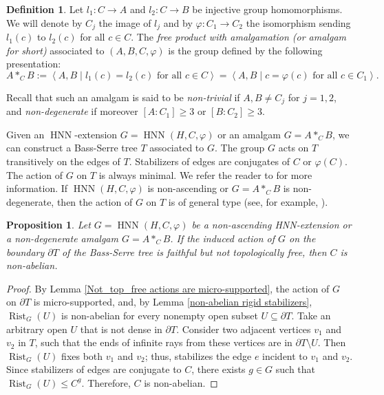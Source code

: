 \documentclass[11pt,letterpaper]{article}
\renewcommand{\phi}{\varphi}
\DeclareMathOperator{\rist}{Rist}
\DeclareMathOperator{\HNN}{HNN}
\newtheorem{prop}[thm]{Proposition}
\theoremstyle{definition}
\newtheorem{defn}[thm]{Definition}
\theoremstyle{remark}
\begin{document}
\begin{defn}
Let $l_1: C \rightarrow A$ and $l_2: C \rightarrow B$ be injective group homomorphisms. We will denote by $C_j$ the image of $l_j$ and by $\phi: C_1 \rightarrow C_2$ the isomorphism sending $l_1(c)$ to $l_2(c)$ for all $c \in C$. The {\it free product with amalgamation (or amalgam for short)} associated to $(A, B, C, \phi)$ is the group defined by the following presentation:
$$
A *_{C} B:=\left\langle A, B \mid l_1(c)=l_2(c) \text{ for all } c \in C \right\rangle = \left\langle A, B \mid c=\phi(c) \text{ for all } c \in C_1 \right\rangle.
$$
\end{defn}
Recall that such an amalgam is said to be {\it non-trivial} if $A, B \neq C_j$ for $j=1,2$, and {\it non-degenerate} if moreover $\left[A : C_1\right] \geq 3$ or $\left[B : C_2\right] \geq 3$.

Given an $\HNN$-extension $G=\HNN(H, C, \phi)$ or an amalgam $G=A*_{C}B$, we can construct a Bass-Serre tree $T$ associated to $G$. The group $G$ acts on $T$
transitively on the edges of $T$. Stabilizers of edges are conjugates of $C$ or $\phi(C)$. The action of $G$ on $T$ is always minimal. We refer the reader to \cite{Ser} for more information. If $\HNN(H, C, \phi)$ is non-ascending or $G=A*_{C}B$ is non-degenerate, then the action of $G$ on $T$ is of general type (see, for example, \cite[Sections 2.5, 2.6]{FMMS}).

\begin{prop}
Let $G=\HNN(H, C, \phi)$ be a non-ascending HNN-extension or  a non-degenerate amalgam $G=A*_{C}B$. If the induced action of $G$ on the boundary $\partial T$ of the Bass-Serre tree is faithful but not topologically free, then $C$ is non-abelian. 
\end{prop}
\begin{proof}
 By Lemma \ref{Not_top_free actions are micro-supported}, the action of $G$ on $\partial T$ is micro-supported, and, by Lemma \ref{non-abelian rigid stabilizers}, $\rist_G(U)$ is non-abelian for every nonempty open subset $U \subseteq \partial T$.  Take an arbitrary open $U$ that is not dense in $\partial T$. Consider two adjacent vertices $v_1$ and $v_2$ in $T$, such that the ends of infinite rays from these vertices are in $\partial T \setminus U$. Then $\rist_G(U)$ fixes both $v_1$ and $v_2$; thus, stabilizes the edge $e$ incident to $v_1$ and $v_2$. Since stabilizers of edges are conjugate to $C$, there exists $g \in G$ such that $\rist_G(U) \leq C^g$. Therefore, $C$ is non-abelian.
\end{proof}
\end{document}
